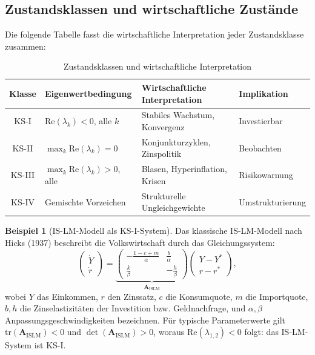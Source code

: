 \documentclass[a4paper, 12pt, twoside, openright]{report}
\theoremstyle{definition}
\newtheorem{example}[theorem]{Beispiel}
\theoremstyle{definition}
\newcommand{\vA}{\bm{A}}
\newcommand{\tr}{\mathrm{tr}}
\newcommand{\re}{\mathrm{Re}}
\begin{document}
\subsection{Zustandsklassen und wirtschaftliche Zustände}

Die folgende Tabelle fasst die wirtschaftliche Interpretation jeder Zustandsklasse
zusammen:

\begin{table}[H]
\centering
\caption{Zustandsklassen und wirtschaftliche Interpretation}
\label{tab:klassen_wirtschaft}
\begin{tabular}{clll}
\toprule
Klasse & Eigenwertbedingung & Wirtschaftliche Interpretation & Implikation \\
\midrule
KS-I   & $\re(\lambda_k) < 0$, alle $k$
        & Stabiles Wachstum, Konvergenz & Investierbar \\
KS-II  & $\max_k\re(\lambda_k) = 0$
        & Konjunkturzyklen, Zinspolitik & Beobachten \\
KS-III & $\max_k\re(\lambda_k) > 0$, alle
        & Blasen, Hyperinflation, Krisen & Risikowarnung \\
KS-IV  & Gemischte Vorzeichen
        & Strukturelle Ungleichgewichte & Umstrukturierung \\
\bottomrule
\end{tabular}
\end{table}

\begin{example}[IS-LM-Modell als KS-I-System]
Das klassische IS-LM-Modell nach Hicks (1937) beschreibt die Volkswirtschaft durch
das Gleichungssystem:
\begin{equation}
  \begin{pmatrix} \dot{Y} \\ \dot{r} \end{pmatrix} =
  \underbrace{\begin{pmatrix} -\frac{1-c+m}{\alpha} & \frac{b}{\alpha} \\
    \frac{k}{\beta} & -\frac{h}{\beta} \end{pmatrix}}_{\vA_{\mathrm{ISLM}}}
  \begin{pmatrix} Y - Y^* \\ r - r^* \end{pmatrix},
  \label{eq:islm}
\end{equation}
wobei $Y$ das Einkommen, $r$ den Zinssatz, $c$ die Konsumquote, $m$ die Importquote,
$b, h$ die Zinselastizitäten der Investition bzw. Geldnachfrage, und $\alpha, \beta$
Anpassungsgeschwindigkeiten bezeichnen. Für typische Parameterwerte gilt
$\tr(\vA_{\mathrm{ISLM}}) < 0$ und $\det(\vA_{\mathrm{ISLM}}) > 0$, woraus
$\re(\lambda_{1,2}) < 0$ folgt: das IS-LM-System ist KS-I.
\end{example}
\end{document}
